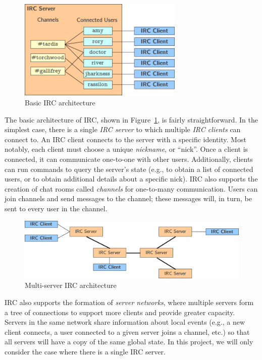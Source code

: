 \documentclass[10pt]{article}
\begin{document}
\begin{figure}
\begin{center}
\includegraphics[width=0.7\textwidth]{architecture1.png}
\caption{Basic IRC architecture}
\end{center}
\label{fig:architecture1}
\end{figure}

The basic architecture of IRC, shown in Figure~\ref{fig:architecture1}, is fairly straightforward. In the simplest case, there is a single \emph{IRC server} to which multiple \emph{IRC clients} can connect to. An IRC client connects to the server with a specific identity. Most notably, each client must choose a unique \emph{nickname}, or ``nick''. Once a client is connected, it can communicate one-to-one with other users. Additionally, clients can run commands to query the server's state (e.g., to obtain a list of connected users, or to obtain additional details about a specific nick). IRC also supports the creation of chat rooms called \emph{channels} for one-to-many communication. Users can join channels and send messages to the channel; these messages will, in turn, be sent to every user in the channel.

\begin{figure}
\begin{center}
\includegraphics[width=1\textwidth]{architecture2.png}
\caption{Multi-server IRC architecture}
\end{center}
\label{fig:architecture2}
\end{figure}

IRC also supports the formation of \emph{server networks}, where multiple servers form a tree of connections to support more clients and provide greater capacity. Servers in the same network share information about local events (e.g., a new client connects, a user connected to a given server joins a channel, etc.) so that all servers will have a copy of the same global state. In this project, we will only consider the case where there is a single IRC server.
\end{document}
